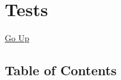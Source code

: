 \chapter*{\color{headtoc} Tests}
\hypertarget{ecldoc:toc:root/Tests}{}
\hyperlink{ecldoc:toc:root}{Go Up}


\section*{Table of Contents}
{\renewcommand{\arraystretch}{1.5}
\begin{longtable}{|p{\textwidth}|}
\hline
\end{longtable}
}

